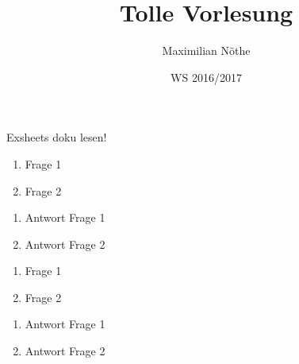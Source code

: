 


\title{Tolle Vorlesung}
\date{WS 2016/2017}
\author{Maximilian Nöthe}


\newcommand{\sheetnumber}{1}
\newcommand{\publishdate}{02.11.2015}
\newcommand{\handindate}{08.11.2015, 23:59 Uhr}
\setcounter{question}{0}




Exsheets doku lesen!

\begin{question}[subtitle={Tolle Aufgabe}]{5}
  \begin{enumerate}
    \item Frage 1
    \item Frage 2
  \end{enumerate}
\end{question}

\begin{solution}
  \begin{enumerate}
    \item Antwort Frage 1
    \item Antwort Frage 2
  \end{enumerate}
\end{solution}

\begin{question}[subtitle={Noch eine tolle Aufgabe}]{5}
  \begin{enumerate}
    \item Frage 1
    \item Frage 2
  \end{enumerate}
\end{question}

\begin{solution}
  \begin{enumerate}
    \item Antwort Frage 1
    \item Antwort Frage 2
  \end{enumerate}
\end{solution}


